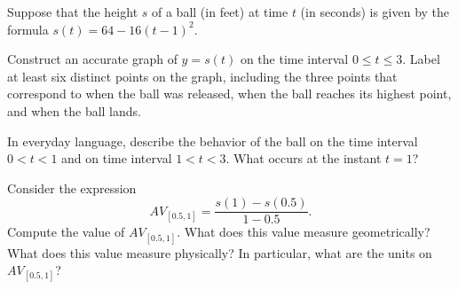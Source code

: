 \begin{pa} \label{PA:1.1}
Suppose that the height $s$ of a ball (in feet) at time $t$ (in seconds) is given by the formula $s(t) = 64 - 16(t-1)^2$.  
\ba
	\item Construct an accurate graph of $y = s(t)$ on the time interval $0 \le t \le 3$.  Label at least six distinct points on the graph, including the three points that correspond to when the ball was released, when the ball reaches its highest point, and when the ball lands.
	\item In everyday language, describe the behavior of the ball on the time interval $0 < t < 1$ and on time interval $1 < t < 3$.  What occurs at the instant $t = 1$?
	\item Consider the expression 
	$$AV_{[0.5,1]} = \frac{s(1) - s(0.5)}{1-0.5}.$$
	Compute the value of $AV_{[0.5,1]}$.  What does this value measure geometrically?  What does this value measure physically?  In particular, what are the units on $AV_{[0.5,1]}$?
\ea
\end{pa} \afterpa